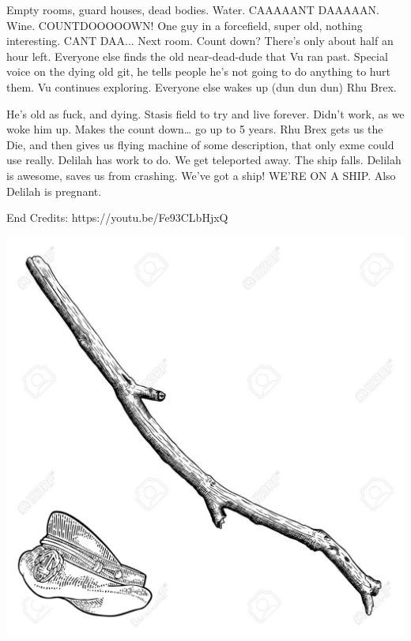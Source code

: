 Empty rooms, guard houses, dead bodies. Water. CAAAAANT DAAAAAN. Wine. COUNTDOOOOOWN! One guy in a forcefield, super old, nothing interesting. CANT DAA... Next room. Count down? There’s only about half an hour left. Everyone else finds the old near-dead-dude that Vu ran past. Special voice on the dying old git, he tells people he’s not going to do anything to hurt them. Vu continues exploring. Everyone else wakes up (dun dun dun) Rhu Brex.\medskip

He’s old as fuck, and dying. Stasis field to try and live forever. Didn’t work, as we woke him up. Makes the count down… go up to 5 years. Rhu Brex gets us the Die, and then gives us flying machine of some description, that only exme could use really. Delilah has work to do. We get teleported away. The ship falls. Delilah is awesome, saves us from crashing. We’ve got a ship! WE’RE ON A SHIP. Also Delilah is pregnant.\medskip

End Credits: https://youtu.be/Fe93CLbHjxQ




\vspace*{5mm}

\begin{center}
\includegraphics[width=\textwidth]{./content/img/xxx.jpg}
\begin{figure}[h]
\end{figure}
\end{center}

\clearpage